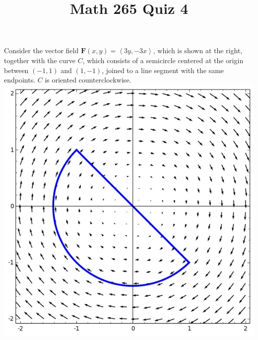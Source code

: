 \documentclass[12pt]{article}
\title{Math 265 Quiz 4}\author{}\date{}
\begin{document}
\maketitle
\thispagestyle{empty}

\begin{multicols}{2}
Consider the vector field $\mathbold{F}\left(x,y\right)
=\left\langle 3y,-3x\right\rangle$, which is shown
at the right, together with the curve $C$,
which consists of a semicircle centered at the origin
between $\left(-1,1\right)$ and $\left(1,-1\right)$,
joined to a line segment with the same endpoints.
$C$ is oriented counterclockwise.
\includegraphics[scale=.6]{Cardioid}
\end{multicols}
\end{document}

